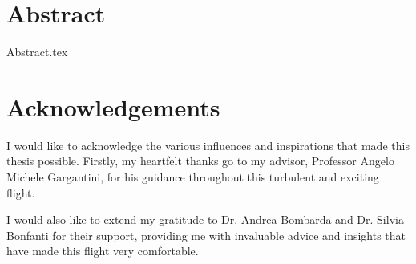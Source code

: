 \documentclass[
	12pt,
	a4paper,
	cleardoublepage=empty,
	headings=twolinechapter,
	numbers=autoenddot,
]{scrbook}
\begin{document}
	\frontmatter
	
	\begin{frontespizio}
		\Margini{3cm}{3cm}{3cm}{3cm}
		\Punteggiatura{}
		\begin{Preambolo*}
			\usepackage[english]{babel}
			\usepackage[T1]{fontenc}
			\usepackage[utf8]{inputenc}
			\usepackage{microtype}
			\graphicspath{{img/}}
			
			\renewcommand{\frontinstitutionfont}{\fontsize{14}{17}\bfseries\scshape}
			\renewcommand{\fronttitlefont}{\fontsize{17}{21}\bfseries\scshape}
			\renewcommand{\frontfootfont}{\fontsize{12}{14}\bfseries\scshape}
		\end{Preambolo*}
	\end{frontespizio}
	
	\cleardoublepage
	
	
	\chapter*{Abstract}
	{Abstract.tex}
	
	\chapter*{Acknowledgements}
	I would like to acknowledge the various influences and inspirations that made this thesis possible. Firstly, my heartfelt thanks go to my advisor, Professor Angelo Michele Gargantini, for his guidance throughout this turbulent and exciting flight.
	
	I would also like to extend my gratitude to Dr. Andrea Bombarda and Dr. Silvia Bonfanti for their support, providing me with invaluable advice and insights that have made this flight very comfortable. 
	
\end{document}
